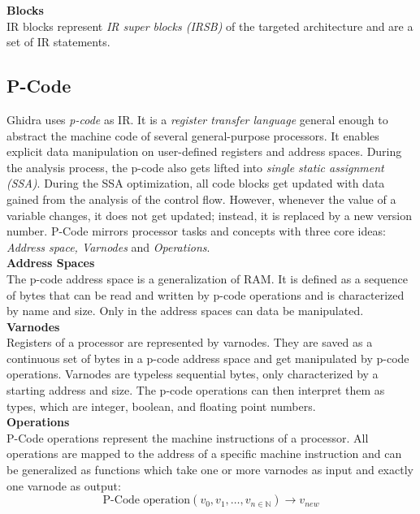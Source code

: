 \documentclass[seminar]{plai}
\begin{document}
\noindent\textbf{Blocks}\\
IR blocks represent \textit{IR super blocks (IRSB)} of the targeted architecture and are a set of IR statements.

\subsection{P-Code}
 Ghidra uses \textit{p-code} as IR. It is a \textit{register transfer language} \cite{PCode-reference-manual} general enough to abstract the machine code of several general-purpose processors. It enables explicit data manipulation on user-defined registers and address spaces. During the analysis process, the p-code also gets lifted into \textit{single static assignment (SSA)}\cite{working-with-ghidras-pCode-to-identify-vulnerable-function-calls}. During the SSA optimization, all code blocks get updated with data gained from the analysis of the control flow. However, whenever the value of a variable changes, it does not get updated; instead, it is replaced by a new version number.\cite{introduction-to-compilers-and-language-design}
P-Code mirrors processor tasks and concepts with three core ideas: \textit{Address space, Varnodes} and \textit{Operations}.\\

\noindent\textbf{Address Spaces}\\
The p-code address space is a generalization of RAM.
It is defined as a sequence of bytes that can be read and written by p-code operations and is characterized by name and size. Only in the address spaces can data be manipulated.\\

\noindent\textbf{Varnodes}\\
Registers of a processor are represented by varnodes. They are saved as a continuous set of bytes in a p-code address space and get manipulated by p-code operations.
Varnodes are typeless sequential bytes, only characterized by a starting address and size. The p-code operations can then interpret them as types, which are integer, boolean, and floating point numbers.\\

\noindent\textbf{Operations}\\
P-Code operations represent the machine instructions of a processor.
All operations are mapped to the address of a specific machine instruction and can be generalized as functions which take one or more varnodes as input and exactly one varnode as output:\cite{PCode-reference-manual}
$$
\text{P-Code operation}(v_0,v_1,\dots,v_{n\in\mathbb N}) \rightarrow v_{new}
$$
\end{document}
